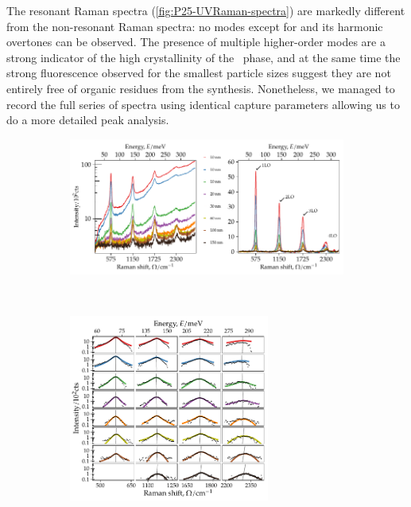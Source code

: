 \documentclass[webedition,openright,titles,swedish,english]{LuaUUThesis}\usepackage[]{graphicx}\usepackage[]{xcolor}
\newenvironment{knitrout}{}{} %
\begin{document}
The resonant Raman spectra (\cref{fig:P25-UVRaman-spectra}) are markedly different
from the non-resonant Raman spectra:
no modes except for  and its harmonic overtones can be observed.
The presence of multiple higher-order modes are a strong indicator of the high
crystallinity of the \ZnO\ phase, and at the same time the strong fluorescence
observed for the smallest particle sizes suggest they are not entirely free of
organic residues from the synthesis. Nonetheless, we managed to record the full
series of spectra using identical capture parameters allowing us to do a more
detailed peak analysis.

\begin{figure}[tbp]
\centering
\begin{subfigure}[b]{\textwidth}
\centering
\begin{knitrout}\scriptsize
{}\color{fgcolor}

{\centering \includegraphics[width=4.72in]{figure/0525P-fig-UVRaman-baseline-1} 

}


\end{knitrout}
\caption{}
\label{fig:P25-UVRaman-baseline}
\end{subfigure}%
\\%
\begin{subfigure}{0.55\textwidth}
\centering
% 
\begin{knitrout}\scriptsize
{}\color{fgcolor}

{\centering \includegraphics[width=2.596in]{figure/0525P-fig-UVRaman-peaks-in-grid-1} 

}
\end{knitrout}
\end{subfigure}
\end{figure}
\end{document}
